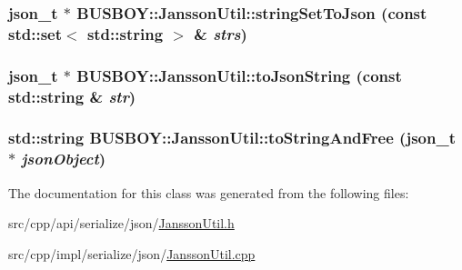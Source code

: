 \label{classBUSBOY_1_1JanssonUtil_aa5d1804e4c6802073d447aebece437a0}
\hypertarget{classBUSBOY_1_1JanssonUtil_a9d1444718edc427fbfbf94a3357d46f1}{
\subsubsection[{stringSetToJson}]{\setlength{\rightskip}{0pt plus 5cm}json\_\-t $\ast$ BUSBOY::JanssonUtil::stringSetToJson (const std::set$<$ std::string $>$ \& {\em strs})}}
\label{classBUSBOY_1_1JanssonUtil_a9d1444718edc427fbfbf94a3357d46f1}
\hypertarget{classBUSBOY_1_1JanssonUtil_a8846f73c10483cc2dfc08e9e6a8bc761}{
\subsubsection[{toJsonString}]{\setlength{\rightskip}{0pt plus 5cm}json\_\-t $\ast$ BUSBOY::JanssonUtil::toJsonString (const std::string \& {\em str})}}
\label{classBUSBOY_1_1JanssonUtil_a8846f73c10483cc2dfc08e9e6a8bc761}
\hypertarget{classBUSBOY_1_1JanssonUtil_aa2a5ec966cd37435128658373c837ef7}{
\subsubsection[{toStringAndFree}]{\setlength{\rightskip}{0pt plus 5cm}std::string BUSBOY::JanssonUtil::toStringAndFree (json\_\-t $\ast$ {\em jsonObject})}}
\label{classBUSBOY_1_1JanssonUtil_aa2a5ec966cd37435128658373c837ef7}


The documentation for this class was generated from the following files:\begin{DoxyCompactItemize}
\item 
src/cpp/api/serialize/json/\hyperlink{JanssonUtil_8h}{JanssonUtil.h}\item 
src/cpp/impl/serialize/json/\hyperlink{JanssonUtil_8cpp}{JanssonUtil.cpp}\end{DoxyCompactItemize}
